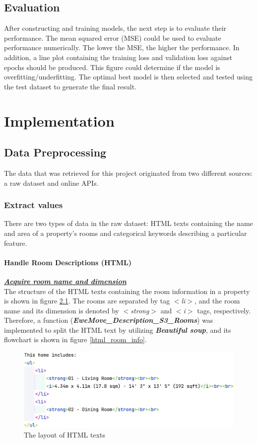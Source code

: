 \documentclass[12pt,twoside]{report}
\begin{document}
\section{Evaluation}
After constructing and training models, the next step is to evaluate their performance. The mean squared error (MSE) could be used to evaluate performance numerically. The lower the MSE, the higher the performance. In addition, a line plot containing the training loss and validation loss against epochs should be produced. This figure could determine if the model is overfitting/underfitting. The optimal best model is then selected and tested using the test dataset to generate the final result. 

\chapter{Implementation}
\section{Data Preprocessing}
The data that was retrieved for this project originated from two different sources: a raw dataset and online APIs. 

\subsection{Extract values}
There are two types of data in the raw dataset: HTML texts containing the name and area of a property's rooms and categorical keywords describing a particular feature.

\subsubsection{Handle Room Descriptions (HTML)}
\textbf{\textit{\underline{Acquire room name and dimension}}} \\
The structure of the HTML texts containing the room information in a property is shown in figure \ref{html_structure}. The rooms are separated by tag \textit{$<$li$>$}, and the room name and its dimension is denoted by \textit{$<$strong$>$} and \textit{$<$i$>$} tags, respectively. Therefore, a function (\textit{\textbf{EweMove\_Description\_S3\_Rooms}}) was implemented to split the HTML text by utilizing \textit{\textbf{Beautiful soup}}, and its flowchart is shown in figure \ref{html_room_info}.
\begin{figure}[h]
	\centering
	\includegraphics[width=15cm]{html_structure}
	\caption{The layout of HTML texts}
	\label{html_structure}
\end{figure}
\end{document}
